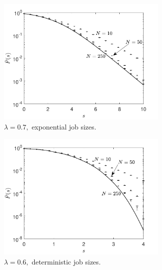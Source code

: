 \documentclass[12pt]{report}
\begin{document}
\begin{figure}[t]
\begin{subfigure}{.45\textwidth}
\begin{center}
\includegraphics[width=0.9\textwidth]{figures/Chapter3/Exp1d2N1050250WLlam07.pdf}
\caption{$\lambda=0.7,$ exponential job sizes.}
\label{fig:validateEXP}
\end{center}
\end{subfigure}
\begin{subfigure}{.45\textwidth}
\begin{center}
\includegraphics[width=0.9\textwidth]{figures/Chapter3/Det1d2N1050250WLlam06.pdf}
\caption{$\lambda=0.6,$ deterministic job sizes.}
\label{fig:validateDET}
\end{center}
\end{subfigure}
\vspace*{4mm}
\begin{subfigure}{.45\textwidth}

\end{subfigure}
\end{figure}
\end{document}
